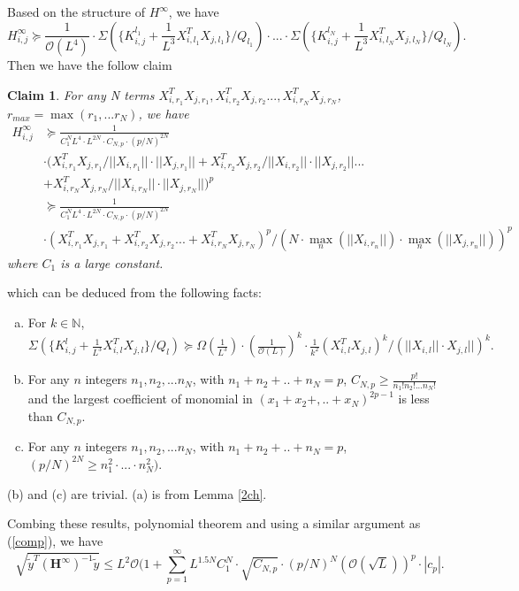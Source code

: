 \documentclass{article}
\newcommand{\cO}{\mathcal{O}}
\newtheorem{cla}{\textbf{Claim}}[section]
\begin{document}
Based on the structure of $H^\infty$, we have
$$H^\infty_{i,j}\succeq \frac{1}{\cO(L^4)}\cdot \Sigma(\{K^{l_1}_{i,j}+\frac{1}{L^3}X_{i,l_1}^TX_{j,l_1}\}/Q_{l_1})\cdot... \cdot \Sigma(\{K^{l_N}_{i,j}+\frac{1}{L^3}X_{i,l_N}^TX_{j,l_N}\}/Q_{l_N}).$$
Then we have the follow claim
\begin{cla}\label{cf}
For any N terms $X_{i,r_1}^TX_{j,r_1}, X_{i,r_2}^TX_{j,r_2}...,X_{i,r_N}^TX_{j,r_N}$, $r_{max}=\max(r_1,...r_N)$, we have
\begin{equation}
\begin{aligned}
H^\infty_{i,j}&\succeq \frac{1}{C_1^N L^4 \cdot L^{2N} \cdot C_{N,p}\cdot(p/N)^{2N}}\\
&\cdot (X_{i,r_1}^TX_{j,r_1}/||X_{i,r_1}||\cdot ||X_{j,r_1}|| +X_{i,r_2}^TX_{j,r_2}/||X_{i,r_2}||\cdot ||X_{j,r_2}||...\\
& + X_{i,r_N}^TX_{j,r_N}/||X_{i,r_N}||\cdot ||X_{j,r_N}||)^{p}\\
&\succeq \frac{1}{C_1^N L^4 \cdot L^{2N} \cdot C_{N,p}\cdot(p/N)^{2N}}\\
&\cdot (X_{i,r_1}^TX_{j,r_1} +X_{i,r_2}^TX_{j,r_2}... + X_{i,r_N}^TX_{j,r_N})^p/(N\cdot \max_n(||X_{i,r_n}||)\cdot \max_n(||X_{j,r_n}||)) ^{p}
\end{aligned}
\end{equation}
where $C_1$ is a large constant.
\end{cla}
which can be deduced from the following facts:
\begin{enumerate}[(a)]
\item For $k\in\mathbb{N}$, $\Sigma(\{K^{l}_{i,j}+\frac{1}{L^3}X_{i,l}^TX_{j,l}\}/Q_{l})\succeq  \Omega( \frac{1}{L^3}) \cdot (\frac{1}{\cO(L)})^{k}\cdot \frac{1}{k^2} (X_{i,l}^TX_{j,l})^{k}/(||X_{i,l}||\cdot X_{j,l}||)^{k}.$
\item For any $n$ integers $n_1,n_2,...n_N$, with $n_1+n_2+..+n_N=p$,  $C_{N,p}\geq \frac{p!}{n_1!n_2!...n_N!}$ and the largest coefficient of monomial in $(x_1+x_2+,..+x_N)^{2p-1}$ is less than $C_{N,p}$.
\item For any $n$ integers $n_1,n_2,...n_N$, with $n_1+n_2+..+n_N=p$, $(p/N)^{2N}\geq n^2_1\cdot...\cdot n^2_N)$.
\end{enumerate}

(b) and (c) are trivial. (a) is from Lemma \ref{2ch}.


Combing these results, polynomial theorem  and using a similar argument as (\ref{comp}), we have
$$\sqrt{\widetilde{y}^T (\bm{H}^\infty)^{-1}\widetilde{y}}\leq L^2\cO(1+\sum_{p=1}^\infty  L^{1.5N} C_1^N\cdot \sqrt{C_{N,p}}\cdot (p/N)^N (\cO(\sqrt{L}))^{p} \cdot |c_{p}|.$$
\end{document}

